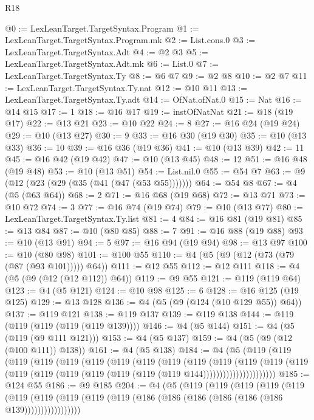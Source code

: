 \begin{lexlean}{R18}
\begin{coremodule}
{{{{{{{{{{{{{{{{{{{{{{{{{{{{{{{{{{{{{{{{{{{{{{{{{{{{{{{{{{{{{{{{{{{{{{{{{{{{{{{{{{{{{{{{{{{{{{{{{{{{{{{{{{{{{{{{{{{{{{{{{{{{@0 := LexLeanTarget.TargetSyntax.Program
@1 := LexLeanTarget.TargetSyntax.Program.mk
@2 := List.cons.{0}
@3 := LexLeanTarget.TargetSyntax.Adt
@4 := @2 @3
@5 := LexLeanTarget.TargetSyntax.Adt.mk
@6 := List.{0}
@7 := LexLeanTarget.TargetSyntax.Ty
@8 := @6 @7
@9 := @2 @8
@10 := @2 @7
@11 := LexLeanTarget.TargetSyntax.Ty.nat
@12 := @10 @11
@13 := LexLeanTarget.TargetSyntax.Ty.adt
@14 := OfNat.ofNat.{0}
@15 := Nat
@16 := @14 @15
@17 := 1
@18 := @16 @17
@19 := instOfNatNat
@21 := @18 (@19 @17)
@22 := @13 @21
@23 := @10 @22
@24 := 8
@27 := @16 @24 (@19 @24)
@29 := @10 (@13 @27)
@30 := 9
@33 := @16 @30 (@19 @30)
@35 := @10 (@13 @33)
@36 := 10
@39 := @16 @36 (@19 @36)
@41 := @10 (@13 @39)
@42 := 11
@45 := @16 @42 (@19 @42)
@47 := @10 (@13 @45)
@48 := 12
@51 := @16 @48 (@19 @48)
@53 := @10 (@13 @51)
@54 := List.nil.{0}
@55 := @54 @7
@63 := @9 (@12 (@23 (@29 (@35 (@41 (@47 (@53 @55)))))))
@64 := @54 @8
@67 := @4 (@5 (@63 @64))
@68 := 2
@71 := @16 @68 (@19 @68)
@72 := @13 @71
@73 := @10 @72
@74 := 3
@77 := @16 @74 (@19 @74)
@79 := @10 (@13 @77)
@80 := LexLeanTarget.TargetSyntax.Ty.list
@81 := 4
@84 := @16 @81 (@19 @81)
@85 := @13 @84
@87 := @10 (@80 @85)
@88 := 7
@91 := @16 @88 (@19 @88)
@93 := @10 (@13 @91)
@94 := 5
@97 := @16 @94 (@19 @94)
@98 := @13 @97
@100 := @10 (@80 @98)
@101 := @100 @55
@110 := @4 (@5 (@9 (@12 (@73 (@79 (@87 (@93 @101))))) @64))
@111 := @12 @55
@112 := @12 @111
@118 := @4 (@5 (@9 (@12 (@12 @112)) @64))
@119 := @9 @55
@121 := @119 (@119 @64)
@123 := @4 (@5 @121)
@124 := @10 @98
@125 := 6
@128 := @16 @125 (@19 @125)
@129 := @13 @128
@136 := @4 (@5 (@9 (@124 (@10 @129 @55)) @64))
@137 := @119 @121
@138 := @119 @137
@139 := @119 @138
@144 := @119 (@119 (@119 (@119 (@119 @139))))
@146 := @4 (@5 @144)
@151 := @4 (@5 (@119 (@9 @111 @121)))
@153 := @4 (@5 @137)
@159 := @4 (@5 (@9 (@12 (@100 @111)) @138))
@161 := @4 (@5 @138)
@184 := @4
    (@5
      (@119
        (@119
          (@119
            (@119
              (@119
                (@119
                  (@119
                    (@119
                      (@119
                        (@119
                          (@119
                            (@119
                              (@119
                                (@119
                                  (@119
                                    (@119 (@119 (@119 (@119 (@119 (@119 @144))))))))))))))))))))))
@185 := @124 @55
@186 := @9 @185
@204 := @4
    (@5
      (@119
        (@119
          (@119
            (@119
              (@119
                (@119
                  (@119 (@119 (@119 (@119 (@186 (@186 (@186 (@186 (@186 (@186 @139)))))))))))))))))
}}}}}}}}}}}}}}}}}}}}}}}}}}}}}}}}}}}}}}}}}}}}}}}}}}}}}}}}}}}}}}}}}}}}}}}}}}}}}}}}}}}}}}}}}}}}}}}}}}}}}}}}}}}}}}}}}}}}}}}}}}}}
\end{coremodule}
\end{lexlean}
